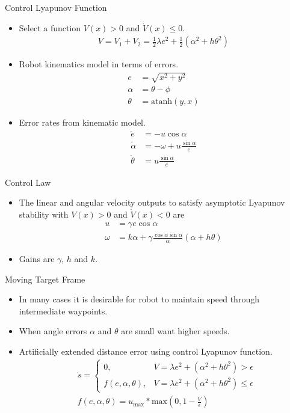 \documentclass[hyperref={pdfpagelabels=false}]{beamer}
\begin{document}
\begin{frame}{Control Lyapunov Function}
\begin{itemize}
\item Select a function $V(x) > 0$ and $\dot{V}(x) \leq 0$.
\begin{align*}
V = V_1 + V_2 = \frac{1}{2}\lambda e^2 + \frac{1}{2}\left(\alpha^2+h\theta^2\right)
\end{align*}
\item Robot kinematics model in terms of errors.
\begin{align*}
e &= \sqrt{x^2+y^2} \\
\alpha &= \theta - \phi \\
\theta &= \text{atanh}(y,x)
\end{align*}
\item Error rates from kinematic model.
\begin{align*}
\dot{e} &= -u\cos\alpha \\
\dot{\alpha} &= -\omega + u\frac{\sin\alpha}{e} \\
\dot{\theta} &= u\frac{\sin\alpha}{e}
\end{align*}
\end{itemize}
\end{frame}

\begin{frame}{Control Law}
\begin{itemize}
\item The linear and angular velocity outputs to satisfy asymptotic Lyapunov stability with $V(x)>0$ and $\dot{V}(x) < 0$ are
\begin{align*}
u &= \gamma e\cos\alpha \\
\omega &= k\alpha + \gamma\frac{\cos\alpha\sin\alpha}{\alpha}\left(\alpha+h\theta\right)
\end{align*}
\item Gains are $\gamma$, $h$ and $k$.
\end{itemize}
\end{frame}

\begin{frame}{Moving Target Frame}
\begin{itemize}
\item In many cases it is desirable for robot to maintain speed through intermediate waypoints.
\item When angle errors $\alpha$ and $\theta$ are small want higher speeds.
\item Artificially extended distance error using control Lyapunov function.
\begin{align*}
&\dot{s} =
\begin{cases}
0, & V = \lambda e^2 + (\alpha^2+h\theta^2) > \epsilon \\
f(e,\alpha,\theta), & V = \lambda e^2 + (\alpha^2+h\theta^2) \leq \epsilon
\end{cases} \\
&f(e,\alpha,\theta) = u_{\text{max}} * \text{max}\left(0, 1 - \frac{V}{\epsilon}\right)
\end{align*}
\end{itemize}
\end{frame}
\end{document}
